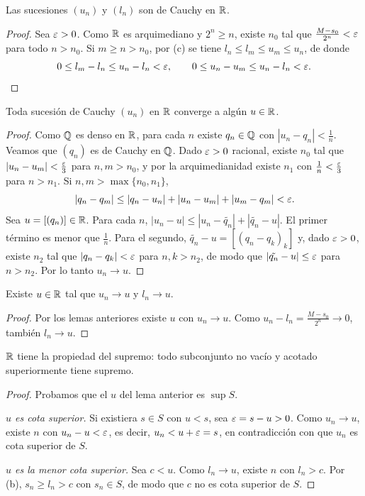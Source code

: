 \begin{lemma}
  Las sucesiones \((u_n)\) y \((l_n)\) son de Cauchy en \(\mathbb{R}\).
\end{lemma}

\begin{proof}
  Sea \(\varepsilon > 0\). Como \(\mathbb{R}\) es arquimediano y \(2^n \geq n\), existe \(n_0\) tal que \(\frac{M - s_0}{2^n} < \varepsilon\) para todo \(n > n_0\). Si \(m \geq n > n_0\), por (c) se tiene \(l_n \leq l_m \leq u_m \leq u_n\), de donde
  \[
    0 \leq l_m - l_n \leq u_n - l_n < \varepsilon, \qquad 0 \leq u_n - u_m \leq u_n - l_n < \varepsilon. \qedhere
  \]
\end{proof}

\begin{lemma}
  Toda sucesión de Cauchy \((u_n)\) en \(\mathbb{R}\) converge a algún \(u \in \mathbb{R}\).
\end{lemma}

\begin{proof}
  Como \(\mathbb{Q}\) es denso en \(\mathbb{R}\), para cada \(n\) existe \(q_n \in \mathbb{Q}\) con \(|u_n - q_n| < \frac{1}{n}\). Veamos que \((q_n)\) es de Cauchy en \(\mathbb{Q}\). Dado \(\varepsilon > 0\) racional, existe \(n_0\) tal que \(|u_n - u_m| < \frac{\varepsilon}{3}\) para \(n, m > n_0\), y por la arquimedianidad existe \(n_1\) con \(\frac{1}{n} < \frac{\varepsilon}{3}\) para \(n > n_1\). Si \(n, m > \max\{n_0, n_1\}\),
  \[
    |q_n - q_m| \leq |q_n - u_n| + |u_n - u_m| + |u_m - q_m| < \varepsilon.
  \]
  Sea \(u = [(q_n)] \in \mathbb{R}\). Para cada \(n\), \(|u_n - u| \leq |u_n - \tilde{q_n}| + |\tilde{q_n} - u|\). El primer término es menor que \(\frac{1}{n}\). Para el segundo, \(\tilde{q_n} - u = [(q_n - q_k)_k]\) y, dado \(\varepsilon > 0\), existe \(n_2\) tal que \(|q_n - q_k| < \varepsilon\) para \(n, k > n_2\), de modo que \(|\tilde{q_n} - u| \leq \varepsilon\) para \(n > n_2\). Por lo tanto \(u_n \to u\).
\end{proof}

\begin{lemma}
  Existe \(u \in \mathbb{R}\) tal que \(u_n \to u\) y \(l_n \to u\).
\end{lemma}

\begin{proof}
  Por los lemas anteriores existe \(u\) con \(u_n \to u\). Como \(u_n - l_n = \frac{M - s_0}{2^n} \to 0\), también \(l_n \to u\).
\end{proof}

\begin{theorem}
  \(\mathbb{R}\) tiene la propiedad del supremo: todo subconjunto no vacío y acotado superiormente tiene supremo.
\end{theorem}

\begin{proof}
  Probamos que el \(u\) del lema anterior es \(\sup S\).

  \emph{\(u\) es cota superior.} Si existiera \(s \in S\) con \(u < s\), sea \(\varepsilon = s - u > 0\). Como \(u_n \to u\), existe \(n\) con \(u_n - u < \varepsilon\), es decir, \(u_n < u + \varepsilon = s\), en contradicción con que \(u_n\) es cota superior de \(S\).

  \emph{\(u\) es la menor cota superior.} Sea \(c < u\). Como \(l_n \to u\), existe \(n\) con \(l_n > c\). Por (b), \(s_n \geq l_n > c\) con \(s_n \in S\), de modo que \(c\) no es cota superior de \(S\).
\end{proof}
